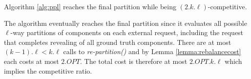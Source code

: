\begin{theorem}	\label{thm:upperbound}
	Algorithm \ref{alg:ppl} reaches the final partition while being $(2.k.\ell)$-competitive.
\end{theorem}
\begin{IEEEproof}
	The algorithm eventually reaches the final partition since it
	 evaluates all possible $\ell$-way partitions of components on each external request,
	including the request that completes revealing of all ground truth components.
	There are at most $(k-1).\ell < k.\ell $ calls to \emph{re-partition()} and by Lemma \ref{lemma:rebalancecost} each costs at most $2.OPT$.
	The total cost is therefore at most $2.OPT.k.\ell$ which implies the competitive ratio.
\end{IEEEproof}